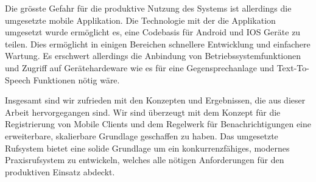 Die grösste Gefahr für die produktive Nutzung des Systems ist allerdings die umgesetzte mobile Applikation.
Die Technologie mit der die Applikation umgesetzt wurde ermöglicht es, eine Codebasis für Android und IOS Geräte zu teilen.
Dies ermöglicht in einigen Bereichen schnellere Entwicklung und einfachere Wartung.
Es erschwert allerdings die Anbindung von Betriebssystemfunktionen und Zugriff auf Gerätehardeware wie es für eine Gegensprechanlage und Text-To-Speech Funktionen nötig wäre.

Insgesamt sind wir zufrieden mit den Konzepten und Ergebnissen, die aus dieser Arbeit hervorgegangen sind.
Wir sind überzeugt mit dem Konzept für die Registrierung von Mobile Clients und dem Regelwerk für Benachrichtigungen eine erweiterbare, skalierbare Grundlage geschaffen zu haben.
Das umgesetzte Rufsystem bietet eine solide Grundlage um ein konkurrenzfähiges, modernes Praxisrufsystem zu entwickeln, welches alle nötigen Anforderungen für den produktiven Einsatz abdeckt.
